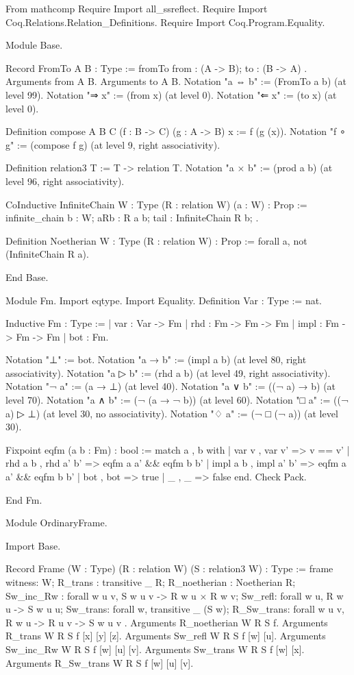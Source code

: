 \begin{spverbatim}
From mathcomp Require Import all_ssreflect.
Require Import Coq.Relations.Relation_Definitions.
Require Import Coq.Program.Equality.

Module Base.

Record FromTo A B : Type :=
  fromTo {
      from : (A -> B);
      to : (B -> A)
    }.
Arguments from {A} {B}.
Arguments to {A} {B}.
Notation "a ⇔ b" := (FromTo a b) (at level 99).
Notation "⇒ x" := (from x) (at level 0).
Notation "⇐ x" := (to x) (at level 0).

Definition compose {A} {B} {C} (f : B -> C) (g : A -> B) x := f (g (x)).
Notation "f ∘ g" := (compose f g) (at level 9, right associativity).

Definition relation3 T := T -> relation T.
Notation "a × b" := (prod a b) (at level 96, right associativity).

CoInductive InfiniteChain {W : Type} (R : relation W) (a : W) : Prop :=
  infinite_chain {
    b : W;
    aRb : R a b;
    tail : InfiniteChain R b;
  }.

Definition Noetherian {W : Type} (R : relation W) : Prop
  := forall {a}, not (InfiniteChain R a).

End Base.

Module Fm.
Import eqtype.
Import Equality.
Definition Var : Type := nat.

Inductive Fm : Type :=
  | var : Var -> Fm
  | rhd : Fm -> Fm -> Fm
  | impl : Fm -> Fm -> Fm
  | bot : Fm.

Notation "⊥" := bot.
Notation "a → b" := (impl a b) (at level 80, right associativity).
Notation "a ▷ b" := (rhd a b) (at level 49, right associativity).
Notation "¬ a" := (a → ⊥) (at level 40).
Notation "a ∨ b" := ((¬ a) → b) (at level 70).
Notation "a ∧ b" := (¬ (a → ¬ b)) (at level 60).
Notation "□ a" := ((¬ a) ▷ ⊥) (at level 30, no associativity).
Notation "♢ a" := (¬ □ (¬ a)) (at level 30).

Fixpoint eqfm (a b : Fm) : bool :=
 match a , b with
   | var v , var v' => v == v'
   | rhd a b , rhd a' b' => eqfm a a' && eqfm b b'
   | impl a b , impl a' b' => eqfm a a' && eqfm b b'
   | bot , bot => true
   | _ , _ => false
 end.
Check Pack.

End Fm.

Module OrdinaryFrame.

Import Base.

Record Frame (W : Type) (R : relation W) (S : relation3 W) : Type :=
  frame {
      witness: W;
      R_trans : transitive _ R;
      R_noetherian : Noetherian R;
      Sw_inc_Rw : forall {w u v}, S w u v -> R w u × R w v;
      Sw_refl: forall {w u}, R w u -> S w u u;
      Sw_trans: forall {w}, transitive _ (S w);
      R_Sw_trans: forall {w u v}, R w u -> R u v -> S w u v
    }.
Arguments R_noetherian {W} {R} {S} f.
Arguments R_trans {W} {R} {S} f [x] [y] [z].
Arguments Sw_refl {W} {R} {S} f [w] [u].
Arguments Sw_inc_Rw {W} {R} {S} f [w] [u] [v].
Arguments Sw_trans {W} {R} {S} f [w] [x].
Arguments R_Sw_trans {W} {R} {S} f [w] [u] [v].


\end{spverbatim}
